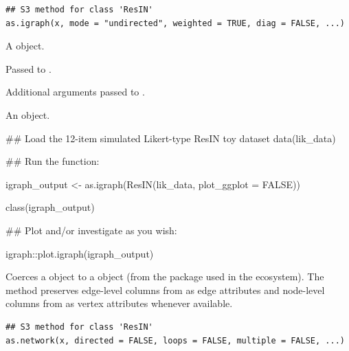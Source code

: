 \documentclass[a4paper]{book}
\begin{document}
%
\begin{Usage}
\begin{verbatim}
## S3 method for class 'ResIN'
as.igraph(x, mode = "undirected", weighted = TRUE, diag = FALSE, ...)
\end{verbatim}
\end{Usage}
%
\begin{Arguments}
\begin{ldescription}
\item[\code{x}] A  object.

\item[\code{mode}, \code{weighted}, \code{diag}] Passed to .

\item[\code{...}] Additional arguments passed to .
\end{ldescription}
\end{Arguments}
%
\begin{Value}
An  object.
\end{Value}
%
\begin{Examples}
\begin{ExampleCode}
## Load the 12-item simulated Likert-type ResIN toy dataset
data(lik_data)

## Run the function:

igraph_output <-  as.igraph(ResIN(lik_data, plot_ggplot = FALSE))

class(igraph_output)

## Plot and/or investigate as you wish:

igraph::plot.igraph(igraph_output)


\end{ExampleCode}
\end{Examples}
%
\begin{Description}
Coerces a  object to a  object (from the
 package used in the  ecosystem). The method
preserves edge-level columns from  as edge attributes
and node-level columns from  as vertex attributes
whenever available.
\end{Description}
%
\begin{Usage}
\begin{verbatim}
## S3 method for class 'ResIN'
as.network(x, directed = FALSE, loops = FALSE, multiple = FALSE, ...)
\end{verbatim}
\end{Usage}
\end{document}
